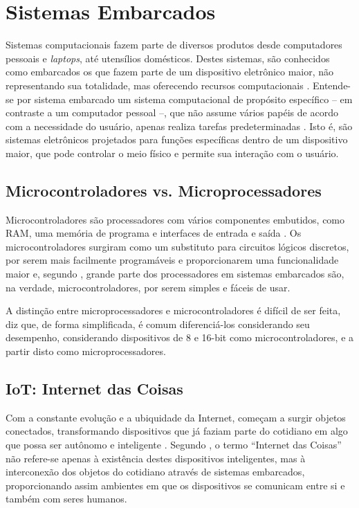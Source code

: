 \section{Sistemas Embarcados}
\label{sec:embarcados}
Sistemas computacionais fazem parte de diversos produtos desde computadores pessoais e \textit{laptops}, até utensílios domésticos. Destes sistemas, são conhecidos como embarcados os que fazem parte de um dispositivo eletrônico maior, não representando sua totalidade, mas oferecendo recursos computacionais \cite{vahid:2002}. Entende-se por sistema embarcado um sistema computacional de propósito específico -- em contraste a um computador pessoal --, que não assume vários papéis de acordo com a necessidade do usuário, apenas realiza tarefas predeterminadas \cite{heath:2002}. Isto é, são sistemas eletrônicos projetados para funções específicas dentro de um dispositivo maior, que pode controlar o meio físico e permite sua interação com o usuário.

\subsection{Microcontroladores vs. Microprocessadores}
Microcontroladores são processadores com vários componentes embutidos, como RAM, uma memória de programa e interfaces de entrada e saída \cite{white:2011}. Os microcontroladores surgiram como um substituto para circuitos lógicos discretos, por serem mais facilmente programáveis e proporcionarem uma funcionalidade maior \cite{heath:2002} e, segundo , grande parte dos processadores em sistemas embarcados são, na verdade, microcontroladores, por serem simples e fáceis de usar.

A distinção entre microprocessadores e microcontroladores é difícil de ser feita,  diz que, de forma simplificada, é comum diferenciá-los considerando seu desempenho, considerando dispositivos de 8 e 16-bit como microcontroladores, e a partir disto como microprocessadores.


\subsection{IoT: Internet das Coisas}
Com a constante evolução e a ubiquidade da Internet, começam a surgir objetos conectados, transformando dispositivos que já faziam parte do cotidiano em algo que possa ser autônomo e inteligente \cite{kopetz:2011}.  Segundo , o termo ``Internet das Coisas''  não refere-se apenas à existência destes dispositivos inteligentes, mas à interconexão dos objetos do cotidiano através de sistemas embarcados, proporcionando assim ambientes em que os dispositivos se comunicam entre si e também com seres humanos.

